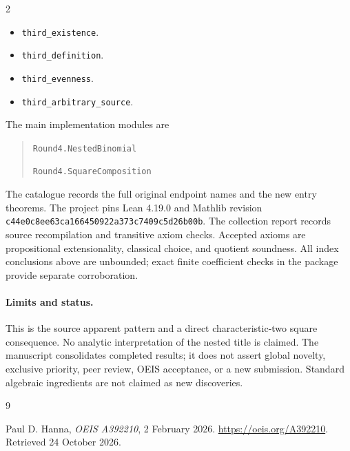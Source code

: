 \documentclass[11pt,a4paper]{article}
\theoremstyle{remark}
\begin{document}
\begin{multicols}{2}\raggedright\begin{itemize}\setlength{\itemsep}{2pt}\setlength{\parsep}{0pt}
\item \nolinkurl{third_existence}.
\item \nolinkurl{third_definition}.
\item \nolinkurl{third_evenness}.
\item \nolinkurl{third_arbitrary_source}.
\end{itemize}\end{multicols}

The main implementation modules are
\begin{quote}\raggedright
\noindent\nolinkurl{Round4.NestedBinomial}\par
\noindent\nolinkurl{Round4.SquareComposition}\par
\end{quote}
The catalogue records the full original endpoint names and the new entry
theorems. The project pins Lean 4.19.0 and Mathlib revision
\nolinkurl{c44e0c8ee63ca166450922a373c7409c5d26b00b}. The collection
report records source recompilation and transitive axiom checks. Accepted
axioms are propositional extensionality, classical choice, and quotient
soundness. All index conclusions above are unbounded; exact finite
coefficient checks in the package provide separate corroboration.

\paragraph{Limits and status.}
This is the source apparent pattern and a direct characteristic-two square consequence. No analytic interpretation of the nested title is claimed.
The manuscript consolidates completed results; it does not assert global
novelty, exclusive priority, peer review, OEIS acceptance, or a new submission.
Standard algebraic ingredients are not claimed as new discoveries.

\begin{thebibliography}{9}
\raggedright
{}
Paul D. Hanna, \emph{OEIS A392210}, 2 February 2026.
\url{https://oeis.org/A392210}. Retrieved 24 October 2026.
\end{thebibliography}
\end{document}
